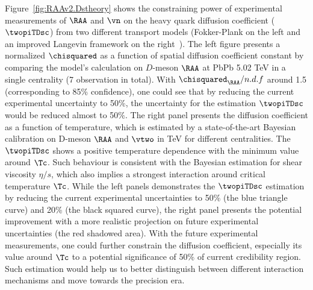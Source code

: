 Figure~\ref{fig:RAAv2.Dstheory} shows the constraining power of experimental measurements of  $\RAA$ and $\vn$ on the heavy quark diffusion coefficient ($\twopiTDsc$) from two different transport models (Fokker-Plank on the left and an improved Langevin framework on the right~\cite{PhysRevC.97.014907}). The left figure presents a normalized $\chisquared$ as a function of spatial diffusion coefficient constant by comparing the model's calculation on $D$-meson $\RAA$ at PbPb 5.02 TeV in a single centrality (7 observation in total). With $\chisquared_{\RAA}/n.d.f$ around 1.5 (corresponding to 85\% confidence), one could see that by reducing the current experimental uncertainty to 50\%, the uncertainty for the estimation $\twopiTDsc$ would be reduced almost to 50$\%$. The right panel presents the diffusion coefficient as a function of temperature, which is estimated by a state-of-the-art Bayesian calibration on D-meson $\RAA$ and $\vtwo$ in  TeV for different centralities. The $\twopiTDsc$ shows a positive temperature dependence with the minimum value around $\Tc$. Such behaviour is consistent with the Bayesian estimation for shear viscosity $\eta/s$, which also implies a strongest interaction around critical temperature $\Tc$. While the left panels demonstrates the $\twopiTDsc$ estimation by reducing the current experimental uncertainties to 50\% (the blue triangle curve) and 20\% (the black squared curve), the right panel presents the potential improvement with a more realistic projection on future experimental uncertainties (the red shadowed area). With the future experimental measurements, one could further constrain the diffusion coefficient, especially its value around $\Tc$ to a potential significance of 50\% of current credibility region. Such estimation would help us to better distinguish between different interaction mechanisms and move towards the precision era. 



